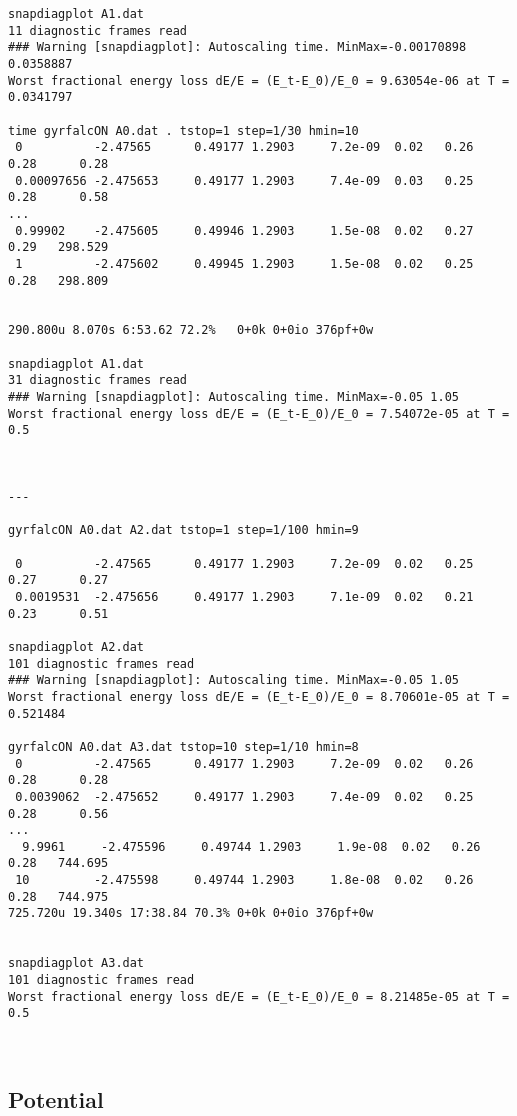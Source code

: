 \begin{verbatim}
snapdiagplot A1.dat
11 diagnostic frames read
### Warning [snapdiagplot]: Autoscaling time. MinMax=-0.00170898 0.0358887
Worst fractional energy loss dE/E = (E_t-E_0)/E_0 = 9.63054e-06 at T = 0.0341797

time gyrfalcON A0.dat . tstop=1 step=1/30 hmin=10
 0          -2.47565      0.49177 1.2903     7.2e-09  0.02   0.26       0.28      0.28
 0.00097656 -2.475653     0.49177 1.2903     7.4e-09  0.03   0.25       0.28      0.58
...
 0.99902    -2.475605     0.49946 1.2903     1.5e-08  0.02   0.27       0.29   298.529
 1          -2.475602     0.49945 1.2903     1.5e-08  0.02   0.25       0.28   298.809


290.800u 8.070s 6:53.62 72.2%   0+0k 0+0io 376pf+0w

snapdiagplot A1.dat
31 diagnostic frames read
### Warning [snapdiagplot]: Autoscaling time. MinMax=-0.05 1.05
Worst fractional energy loss dE/E = (E_t-E_0)/E_0 = 7.54072e-05 at T = 0.5



---

gyrfalcON A0.dat A2.dat tstop=1 step=1/100 hmin=9

 0          -2.47565      0.49177 1.2903     7.2e-09  0.02   0.25       0.27      0.27
 0.0019531  -2.475656     0.49177 1.2903     7.1e-09  0.02   0.21       0.23      0.51

snapdiagplot A2.dat
101 diagnostic frames read
### Warning [snapdiagplot]: Autoscaling time. MinMax=-0.05 1.05
Worst fractional energy loss dE/E = (E_t-E_0)/E_0 = 8.70601e-05 at T = 0.521484

gyrfalcON A0.dat A3.dat tstop=10 step=1/10 hmin=8
 0          -2.47565      0.49177 1.2903     7.2e-09  0.02   0.26       0.28      0.28
 0.0039062  -2.475652     0.49177 1.2903     7.4e-09  0.02   0.25       0.28      0.56
...
  9.9961     -2.475596     0.49744 1.2903     1.9e-08  0.02   0.26       0.28   744.695
 10         -2.475598     0.49744 1.2903     1.8e-08  0.02   0.26       0.28   744.975
725.720u 19.340s 17:38.84 70.3% 0+0k 0+0io 376pf+0w


snapdiagplot A3.dat
101 diagnostic frames read
Worst fractional energy loss dE/E = (E_t-E_0)/E_0 = 8.21485e-05 at T = 0.5



\end{verbatim}\normalsize

\subsection{Potential}

